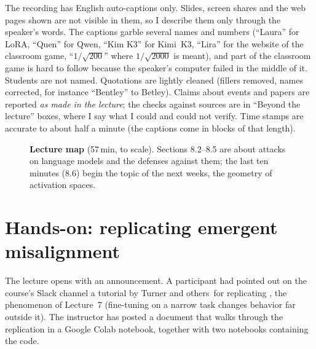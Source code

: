 \begin{caution}
The recording has English auto-captions only. Slides, screen shares and the web pages shown are not visible in them, so I describe them only through the speaker's words. The captions garble several names and numbers (``Laura'' for LoRA, ``Quen'' for Qwen, ``Kim K3'' for Kimi~K3, ``Lira'' for the website of the classroom game, ``$1/\sqrt{200}$'' where $1/\sqrt{2000}$ is meant), and part of the classroom game is hard to follow because the speaker's computer failed in the middle of it. Students are not named. Quotations are lightly cleaned (fillers removed, names corrected, for instance ``Bentley'' to Betley). Claims about events and papers are reported \emph{as made in the lecture}; the checks against sources are in ``Beyond the lecture'' boxes, where I say what I could and could not verify. Time stamps are accurate to about half a minute (the captions come in blocks of that length).
\end{caution}

\begin{figure}[tb]
\centering
{}
\caption{\textbf{Lecture map} (57\,min, to scale). Sections 8.2--8.5 are about attacks on language models and the defenses against them; the last ten minutes (8.6) begin the topic of the next weeks, the geometry of activation spaces.}
\end{figure}

\section{Hands-on: replicating emergent misalignment}\label{sec:L8-handson}
The lecture opens with an announcement. A participant had pointed out on the course's Slack channel a tutorial by Turner and others\,\citep{turner2025} for replicating , the phenomenon of Lecture~7 (fine-tuning on a narrow task changes behavior far outside it). The instructor has posted a document that walks through the replication in a Google Colab notebook, together with two notebooks containing the code.

